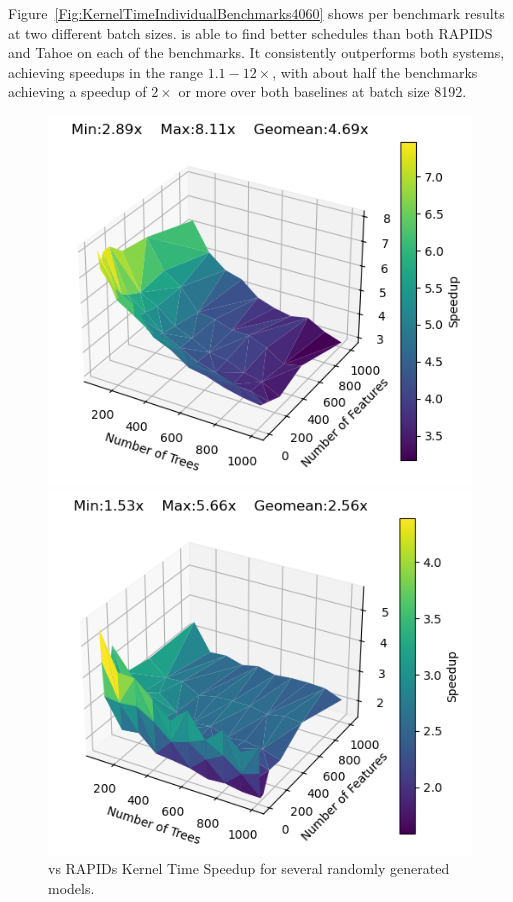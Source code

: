 Figure~\ref{Fig:KernelTimeIndividualBenchmarks4060} shows per benchmark results at two different batch sizes. \Treebeard{} is able to find better schedules than both RAPIDS and Tahoe on each of the benchmarks. It consistently outperforms both systems, achieving speedups in the range $1.1-12\times$, with about half the benchmarks achieving a speedup of $2\times$ or more  over both baselines at batch size 8192.
\begin{figure}[htb]
  \begin{minipage}[t]{.475\linewidth}
    \includegraphics[width=\linewidth]{figures/RandomModels/kernel_speedup_b512_depth8.png}
  \end{minipage}
  \begin{minipage}[t]{.475\linewidth}
    \includegraphics[width=\linewidth]{figures/RandomModels/kernel_speedup_b4096_depth6.png}
  \end{minipage}
  \caption{\label{fig:randomModels4060}\Treebeard{} vs RAPIDs Kernel Time Speedup for several randomly generated models.}
\end{figure}

